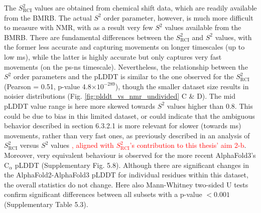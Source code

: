 The $S^{2}_{\text{RCI}}$ values are obtained from chemical shift data, which are readily available from the BMRB. The actual $S^{2}$ order parameter, however, is much more difficult to measure with NMR, with as a result very few $S^{2}$ values available from the BMRB. There are fundamental differences between the $S^{2}_{\text{RCI}}$ and $S^{2}$ values, with the former less accurate and capturing movements on longer timescales (up to low ms), while the latter is highly accurate but only captures very fast movements (on the ps-ns timescale). Nevertheless, the relationship between the $S^{2}$ order parameters and the pLDDT is similar to the one observed for the $S^{2}_{\text{RCI}}$ (Pearson = 0.51, p-value  4.8$\times 10^{-289}$), though the smaller dataset size results in noisier distributions (Fig. \ref{fig:plddt_vs_nmr_undivided} C \& D). The mid pLDDT value range is here more skewed towards $S^{2}$ values higher than 0.8. This could be due to bias in this limited dataset, or could indicate that the ambiguous behavior described in section 6.3.2.1 is more relevant for slower (towards ms) movements, rather than very fast ones, as previously described in an analysis of $S^{2}_{\text{RCI}}$ versus $S^{2}$ values \cite{cilia_protein_2013}\textcolor{red}{, aligned with $S^{2}_{\text{RCI}}$'s contribution to this thesis' aim 2-b}. Moreover, very equivalent behaviour is observed for the more recent AlphaFold3's C$_\alpha$ pLDDT (Supplementary Fig. 5.8).
Although there are significant changes in the AlphaFold2-AlphaFold3 pLDDT for individual residues within this dataset, the overall statistics do not change. Here also Mann-Whitney two-sided U tests confirm significant differences between all subsets with a p-value \( < 0.001 \) (Supplementary Table 5.3).

